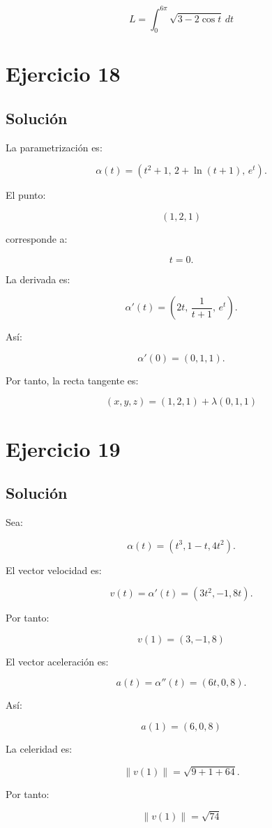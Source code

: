 \documentclass[11pt,a4paper]{article}
\begin{document}
\[
\boxed{
L
=
\int_0^{6\pi}
\sqrt{
3-2\cos t
}\,dt
}
\]

\section{Ejercicio 18}
\subsection{Solución}

La parametrización es:

\[
\alpha(t)
=
(t^2+1,\,
2+\ln(t+1),\,
e^t).
\]

El punto:

\[
(1,2,1)
\]

corresponde a:

\[
t=0.
\]

La derivada es:

\[
\alpha'(t)
=
\left(
2t,\,
\frac1{t+1},\,
e^t
\right).
\]

Así:

\[
\alpha'(0)
=
(0,1,1).
\]

Por tanto, la recta tangente es:

\[
\boxed{
(x,y,z)
=
(1,2,1)
+
\lambda(0,1,1)
}
\]

\section{Ejercicio 19}
\subsection{Solución}

Sea:

\[
\alpha(t)
=
(t^3,1-t,4t^2).
\]

El vector velocidad es:

\[
v(t)
=
\alpha'(t)
=
(3t^2,-1,8t).
\]

Por tanto:

\[
\boxed{
v(1)=(3,-1,8)
}
\]

El vector aceleración es:

\[
a(t)
=
\alpha''(t)
=
(6t,0,8).
\]

Así:

\[
\boxed{
a(1)=(6,0,8)
}
\]

La celeridad es:

\[
\|v(1)\|
=
\sqrt{
9+1+64
}.
\]

Por tanto:

\[
\boxed{
\|v(1)\|=\sqrt{74}
}
\]
\end{document}
